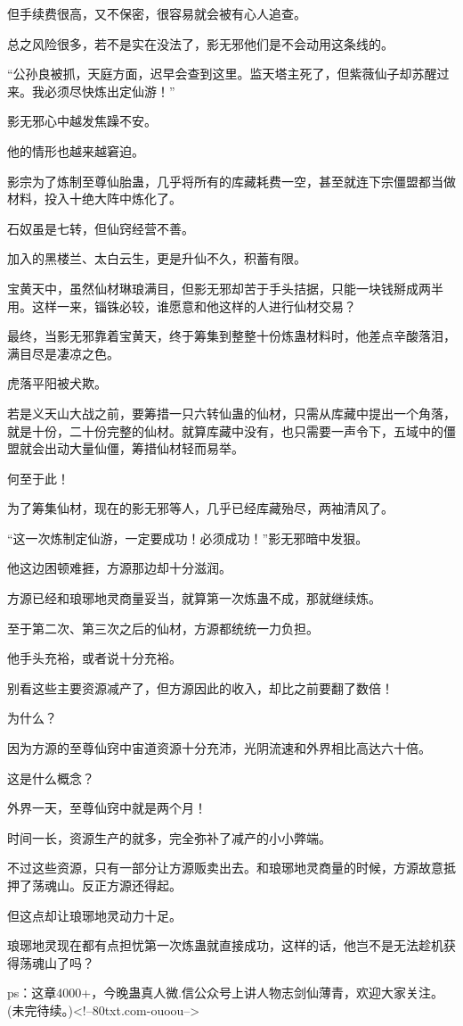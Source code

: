 \begin{this_body}
但手续费很高，又不保密，很容易就会被有心人追查。

总之风险很多，若不是实在没法了，影无邪他们是不会动用这条线的。

“公孙良被抓，天庭方面，迟早会查到这里。监天塔主死了，但紫薇仙子却苏醒过来。我必须尽快炼出定仙游！”

影无邪心中越发焦躁不安。

他的情形也越来越窘迫。

影宗为了炼制至尊仙胎蛊，几乎将所有的库藏耗费一空，甚至就连下宗僵盟都当做材料，投入十绝大阵中炼化了。

石奴虽是七转，但仙窍经营不善。

加入的黑楼兰、太白云生，更是升仙不久，积蓄有限。

宝黄天中，虽然仙材琳琅满目，但影无邪却苦于手头拮据，只能一块钱掰成两半用。这样一来，锱铢必较，谁愿意和他这样的人进行仙材交易？

最终，当影无邪靠着宝黄天，终于筹集到整整十份炼蛊材料时，他差点辛酸落泪，满目尽是凄凉之色。

虎落平阳被犬欺。

若是义天山大战之前，要筹措一只六转仙蛊的仙材，只需从库藏中提出一个角落，就是十份，二十份完整的仙材。就算库藏中没有，也只需要一声令下，五域中的僵盟就会出动大量仙僵，筹措仙材轻而易举。

何至于此！

为了筹集仙材，现在的影无邪等人，几乎已经库藏殆尽，两袖清风了。

“这一次炼制定仙游，一定要成功！必须成功！”影无邪暗中发狠。

他这边困顿难捱，方源那边却十分滋润。

方源已经和琅琊地灵商量妥当，就算第一次炼蛊不成，那就继续炼。

至于第二次、第三次之后的仙材，方源都统统一力负担。

他手头充裕，或者说十分充裕。

别看这些主要资源减产了，但方源因此的收入，却比之前要翻了数倍！

为什么？

因为方源的至尊仙窍中宙道资源十分充沛，光阴流速和外界相比高达六十倍。

这是什么概念？

外界一天，至尊仙窍中就是两个月！

时间一长，资源生产的就多，完全弥补了减产的小小弊端。

不过这些资源，只有一部分让方源贩卖出去。和琅琊地灵商量的时候，方源故意抵押了荡魂山。反正方源还得起。

但这点却让琅琊地灵动力十足。

琅琊地灵现在都有点担忧第一次炼蛊就直接成功，这样的话，他岂不是无法趁机获得荡魂山了吗？

ps：这章4000+，今晚蛊真人微.信公众号上讲人物志剑仙薄青，欢迎大家关注。(未完待续。)<!--80txt.com-ouoou-->

\end{this_body}


